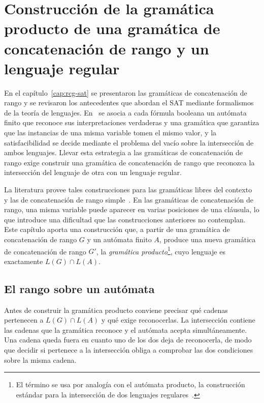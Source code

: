 \documentclass{report}
\theoremstyle{definition}
\theoremstyle{plain}
\theoremstyle{remark}
\begin{document}
\setcounter{chapter}{3}
\chapter{Construcción de la gramática producto de una gramática de concatenación de rango y un lenguaje regular}
\label{cap:interseccion}

En el capítulo~\ref{cap:rcg-sat} se presentaron las gramáticas de
concatenación de rango y se revisaron los antecedentes que abordan el
SAT mediante formalismos de la teoría de lenguajes.
En~\cite{fernandezarias2007, aguileralopez2016} se asocia a cada
fórmula booleana un autómata finito que reconoce sus interpretaciones
verdaderas y una gramática que garantiza que las instancias de una
misma variable tomen el mismo valor, y la satisfacibilidad se decide
mediante el problema del vacío sobre la intersección de ambos
lenguajes. Llevar esta estrategia a las gramáticas de concatenación de
rango exige construir una gramática de concatenación de rango que
reconozca la intersección del lenguaje de otra con un lenguaje
regular.

La literatura provee tales construcciones para las
gramáticas libres del contexto~\cite{barhillel1961} y las de
concatenación de rango simple~\cite{bertsch2001rcg}. En las gramáticas
de concatenación de rango, una misma variable puede aparecer en varias
posiciones de una cláusula, lo que introduce una dificultad que las
construcciones anteriores no contemplan. Este capítulo aporta una
construcción que, a partir de una gramática de concatenación de rango
$G$ y un autómata finito $A$, produce una nueva gramática de
concatenación de rango $G'$, la \emph{gramática
producto}\footnote{El término se usa por analogía con el autómata
producto, la construcción estándar para la intersección de dos
lenguajes regulares~\cite{hopcroft2006introduction}.},
cuyo lenguaje es exactamente $L(G) \cap L(A)$.

\section{El rango sobre un autómata}

Antes de construir la gramática producto conviene precisar qué
cadenas pertenecen a $L(G) \cap L(A)$ y qué exige reconocerlas. La
intersección contiene las cadenas que la gramática reconoce y el
autómata acepta simultáneamente. Una cadena
queda fuera en cuanto uno de los dos deja de reconocerla, de modo que
decidir si pertenece a la intersección obliga a comprobar las dos
condiciones sobre la misma cadena.
\end{document}
